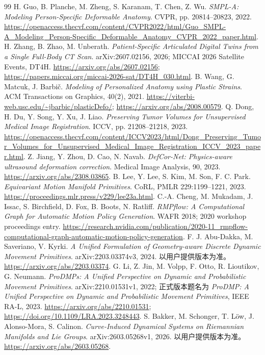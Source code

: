 \documentclass[UTF8,fontset=fandol,11pt,a4paper]{ctexart}
\theoremstyle{plain}
\theoremstyle{definition}
\theoremstyle{remark}
\numberwithin{equation}{section}
\begin{document}
\begin{thebibliography}{99}
 H. Guo, B. Planche, M. Zheng, S. Karanam, T. Chen, Z. Wu.
\emph{SMPL-A: Modeling Person-Specific Deformable Anatomy}. CVPR, pp. 20814--20823, 2022.
\url{https://openaccess.thecvf.com/content/CVPR2022/html/Guo_SMPL-A_Modeling_Person-Specific_Deformable_Anatomy_CVPR_2022_paper.html}.
 H. Zhang, B. Zhao, M. Unberath.
\emph{Patient-Specific Articulated Digital Twins from a Single Full-Body CT Scan}. arXiv:2607.02156, 2026; MICCAI 2026 Satellite Events, DT4H.
\url{https://arxiv.org/abs/2607.02156};
\url{https://papers.miccai.org/miccai-2026-sat/DT4H_030.html}.
 B. Wang, G. Matcuk, J. Barbi\v{c}.
\emph{Modeling of Personalized Anatomy using Plastic Strains}. ACM Transactions on Graphics, 40(2), 2021.
\url{https://viterbi-web.usc.edu/~jbarbic/plasticDefo/};
\url{https://arxiv.org/abs/2008.00579}.
 Q. Dong, H. Du, Y. Song, Y. Xu, J. Liao.
\emph{Preserving Tumor Volumes for Unsupervised Medical Image Registration}. ICCV, pp. 21208--21218, 2023.
\url{https://openaccess.thecvf.com/content/ICCV2023/html/Dong_Preserving_Tumor_Volumes_for_Unsupervised_Medical_Image_Registration_ICCV_2023_paper.html}.
 Z. Jiang, Y. Zhou, D. Cao, N. Navab.
\emph{DefCor-Net: Physics-aware ultrasound deformation correction}. Medical Image Analysis, 90, 2023.
\url{https://arxiv.org/abs/2308.03865}.
 B. Lee, Y. Lee, S. Kim, M. Son, F. C. Park.
\emph{Equivariant Motion Manifold Primitives}. CoRL, PMLR 229:1199--1221, 2023.
\url{https://proceedings.mlr.press/v229/lee23a.html}.
 C.-A. Cheng, M. Mukadam, J. Issac, S. Birchfield, D. Fox, B. Boots, N. Ratliff.
\emph{RMPflow: A Computational Graph for Automatic Motion Policy Generation}. WAFR 2018; 2020 workshop proceedings entry.
\url{https://research.nvidia.com/publication/2020-11_rmpflow-computational-graph-automatic-motion-policy-generation}.
 F. J. Abu-Dakka, M. Saveriano, V. Kyrki.
\emph{A Unified Formulation of Geometry-aware Discrete Dynamic Movement Primitives}. arXiv:2203.03374v3, 2024. 以用户提供版本为准。
\url{https://arxiv.org/abs/2203.03374}.
 G. Li, Z. Jin, M. Volpp, F. Otto, R. Lioutikov, G. Neumann.
\emph{ProDMPs: A Unified Perspective on Dynamic and Probabilistic Movement Primitives}. arXiv:2210.01531v1, 2022; 正式版本题名为 \emph{ProDMP: A Unified Perspective on Dynamic and Probabilistic Movement Primitives}, IEEE RA-L, 2023.
\url{https://arxiv.org/abs/2210.01531}; \url{https://doi.org/10.1109/LRA.2023.3248443}.
 S. Bakker, M. Schonger, T. L\"ow, J. Alonso-Mora, S. Calinon.
\emph{Curve-Induced Dynamical Systems on Riemannian Manifolds and Lie Groups}. arXiv:2603.05268v1, 2026. 以用户提供版本为准。
\url{https://arxiv.org/abs/2603.05268}.
\end{thebibliography}
\end{document}
